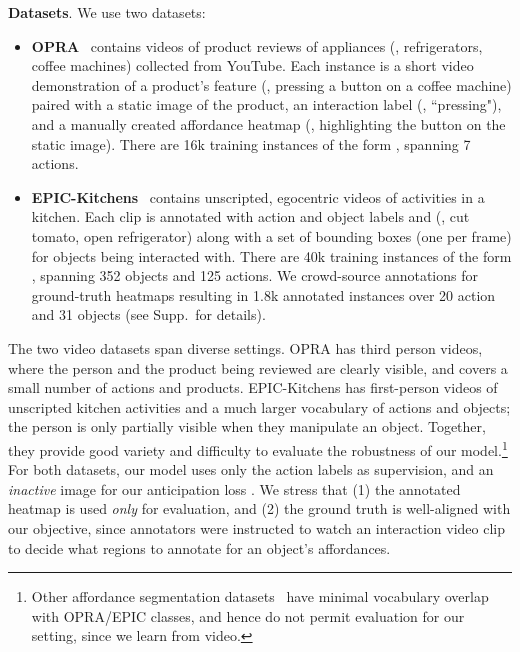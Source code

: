 \documentclass[10pt,twocolumn,letterpaper]{article}
\begin{document}
\vspace{0.05in}
\noindent\textbf{Datasets}. \label{sec:datasets}
We use two datasets:
\begin{itemize}[leftmargin=*]
\item \textbf{OPRA}~\cite{fang2018demo2vec} contains videos of product reviews of appliances (\eg, refrigerators, coffee machines) collected from YouTube. Each instance is a short video demonstration  of a product's feature (\eg, pressing a button on a coffee machine) paired with a static image  of the product, an interaction label  (\eg, ``pressing"), and a manually created affordance heatmap  (\eg, highlighting the button on the static image). There are 16k training instances of the form , spanning 7 actions. 

\item \textbf{EPIC-Kitchens}~\cite{damen2018scaling} contains unscripted, egocentric videos of activities in a kitchen. Each clip  is annotated with action and object labels  and  (\eg, cut tomato, open refrigerator) along with a set of bounding boxes  (one per frame) for objects being interacted with. There are 40k training instances of the form , spanning 352 objects and 125 actions. We crowd-source annotations for ground-truth heatmaps  resulting in 1.8k annotated instances over 20 action and 31 objects (see Supp.~for details).



\end{itemize}

The two video datasets span diverse settings.  OPRA has third person videos, where the person and the product being reviewed are clearly visible, and covers a small number of actions and products. EPIC-Kitchens has first-person videos of unscripted kitchen activities and a much larger vocabulary of actions and objects; the person is only partially visible when they manipulate an object.
Together, they provide good variety and difficulty to evaluate the robustness of our model.\footnote{Other affordance segmentation datasets~\cite{myers2015affordance,nguyen2016detecting} have minimal vocabulary overlap with OPRA/EPIC classes, and hence do not permit evaluation for our setting, since we learn from video.} For both datasets, our model uses only the action labels as supervision, and an \emph{inactive} image for our anticipation loss . We stress that (1) the annotated heatmap  is used \emph{only} for evaluation, and (2) the ground truth is well-aligned with our objective, since annotators were instructed to watch an interaction video clip to decide what regions to annotate for an object's affordances.  
\end{document}
